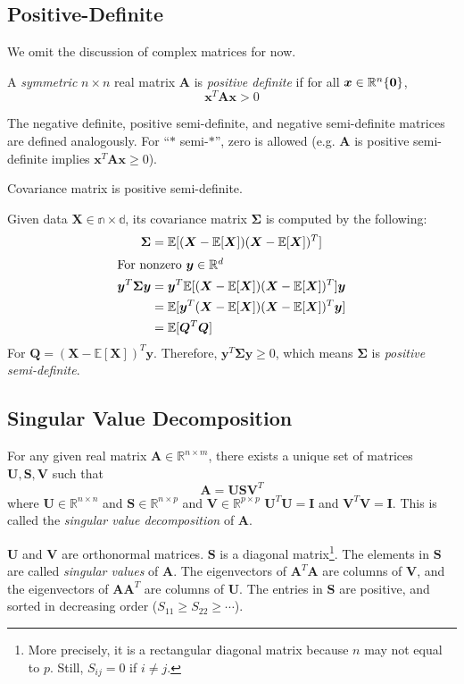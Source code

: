 \subsection{Positive-Definite}
We omit the discussion of complex matrices for now.
\begin{definition}
A \emph{symmetric} $n\times n$ real matrix $\bm{A}$ is \emph{positive definite} if for all $\bm{x}\in\mathbb{R}^n \\ \{\bm{0}\}$, 
\begin{equation}
    \bm{x}^T\bm{Ax} > 0
\end{equation}
\end{definition}
 The negative definite, positive semi-definite, and negative semi-definite matrices are defined analogously. For ``$*$ semi-$*$'', zero is allowed (e.g. $\bm{A}$ is positive semi-definite implies $\bm{x}^T\bm{Ax}\geq 0$).
\begin{theorem}
Covariance matrix is positive semi-definite.
\end{theorem}
\noindent Given data $\bm{X}\in\mathbb{n\times d}$, its covariance matrix $\bm{\Sigma}$ is computed by the following:
\begin{align}
    \bm{\Sigma}&=\mathbb{E}[(\bm{X}-\mathbb{E}[\bm{X}])(\bm{X}-\mathbb{E}[\bm{X}])^T]\\
    \intertext{For nonzero $\bm{y}\in\mathbb{R}^d$}
    \bm{y}^T\bm{\Sigma y} &=  \bm{y}^T\mathbb{E}[(\bm{X}-\mathbb{E}[\bm{X}])(\bm{X}-\mathbb{E}[\bm{X}])^T]\bm{y}\\
    &=  \mathbb{E}[\bm{y}^T(\bm{X}-\mathbb{E}[\bm{X}])(\bm{X}-\mathbb{E}[\bm{X}])^T\bm{y}]\\
    &=  \mathbb{E}[\bm{Q}^T\bm{Q}]
\end{align}
For $\bm{Q}=(\bm{X}-\mathbb{E}[\bm{X}])^T\bm{y}$. Therefore, $\bm{y}^T\bm{\Sigma y}\geq 0$, which means $\bm{\Sigma}$ is \emph{positive semi-definite}.


\subsection{Singular Value Decomposition}
\begin{theorem}
  For any given real matrix $\bm{A}\in\mathbb{R}^{n\times m}$, there exists a unique set of matrices $\bm{U}, \bm{S}, \bm{V}$ such that
  \begin{equation}
    \bm{A} = \bm{USV}^T
  \end{equation}
  where $\bm{U}\in\mathbb{R}^{n\times n}$ and $\bm{S}\in\mathbb{R}^{n\times p}$ and $\bm{V}\in\mathbb{R}^{p\times p}$ $\bm{U}^T\bm{U}=\bm{I}$ and $\bm{V}^T\bm{V}=\bm{I}$. This is called the \emph{singular value decomposition} of $\bm{A}$.
\end{theorem}
$\bm{U}$ and $\bm{V}$ are orthonormal matrices. $\bm{S}$ is a diagonal matrix\footnote{More precisely, it is a rectangular diagonal matrix because $n$ may not equal to $p$. Still, $S_{ij}=0$ if $i\neq j$.}. The elements in $\bm{S}$ are called \emph{singular values} of $\bm{A}$. The eigenvectors of $\bm{A}^T\bm{A}$ are columns of $\bm{V}$, and the eigenvectors of $\bm{A}\bm{A}^T$ are columns of $\bm{U}$. The entries in $\bm{S}$ are positive, and sorted in decreasing order ($S_{11}\geq S_{22}\geq\cdots$).

